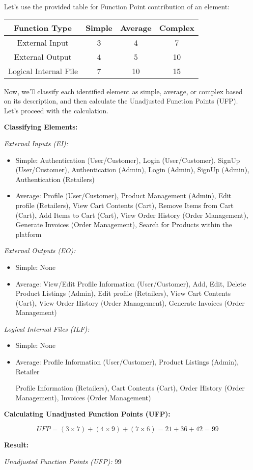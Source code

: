 \documentclass{article}
\begin{document}
Let's use the provided table for Function Point contribution of an element:

\begin{center}
\begin{tabular}{|c|c|c|c|}
\hline
Function Type & Simple & Average & Complex \\
\hline
External Input & 3 & 4 & 7 \\
External Output & 4 & 5 & 10 \\
Logical Internal File & 7 & 10 & 15 \\
\hline
\end{tabular}
\end{center}

Now, we'll classify each identified element as simple, average, or complex based on its description, and then calculate the Unadjusted Function Points (UFP). Let's proceed with the calculation.

\textbf{Classifying Elements:}

\textit{External Inputs (EI):}
\begin{itemize}[leftmargin=*]
    \item Simple: Authentication (User/Customer), Login (User/Customer), SignUp (User/Customer), Authentication (Admin), Login (Admin), SignUp (Admin), Authentication (Retailers)
    \item Average: Profile (User/Customer), Product Management (Admin), Edit profile (Retailers), View Cart Contents (Cart), Remove Items from Cart (Cart), Add Items to Cart (Cart), View Order History (Order Management), Generate Invoices (Order Management), Search for Products within the platform
\end{itemize}

\textit{External Outputs (EO):}
\begin{itemize}[leftmargin=*]
    \item Simple: None
    \item Average: View/Edit Profile Information (User/Customer), Add, Edit, Delete Product Listings (Admin), Edit profile (Retailers), View Cart Contents (Cart), View Order History (Order Management), Generate Invoices (Order Management)
\end{itemize}

\textit{Logical Internal Files (ILF):}
\begin{itemize}[leftmargin=*]
    \item Simple: None
    \item Average: Profile Information (User/Customer), Product Listings (Admin), Retailer

 Profile Information (Retailers), Cart Contents (Cart), Order History (Order Management), Invoices (Order Management)
\end{itemize}

\textbf{Calculating Unadjusted Function Points (UFP):}

\[
UFP = (3 \times 7) + (4 \times 9) + (7 \times 6) = 21 + 36 + 42 = 99
\]

\textbf{Result:}

\textit{Unadjusted Function Points (UFP):} 99
\end{document}
